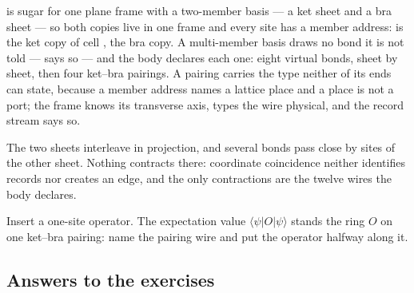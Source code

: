\begin{tnexample}[
  label={tnex:tut-doublelayer},
  formula={\langle\psi|\psi\rangle},
  caption={the norm as a double layer},
  index={Two $2\times2$ sheets in one frame: $A$ marks the ket sheet,
    $\overline{A}$ the bra copy above it.  Each short diagonal is one
    ket--bra physical contraction; nothing stays open, and the empty
    signature says scalar.},
  signature={kernel-boundary|signature=}]
\begin{tenkz}[lattice={2x2}, planes, bonds=none]
   
   
   
   
   
   
\end{tenkz}
\end{tnexample}

 is sugar for one plane frame with a two-member basis ---
a ket sheet and a bra sheet --- so both copies live in one frame and
every site has a member address:  is the ket copy of cell
,  the bra copy.  A multi-member basis draws
no bond it is not told ---  says so --- and the
body declares each one: eight virtual bonds, sheet by sheet, then four
ket--bra pairings.  A pairing carries the type neither of its ends can
state, because a member address names a lattice place and a place is not
a port; the frame knows its transverse axis, types the wire physical,
and the record stream says so.

\dbendpar The two sheets interleave in projection, and several bonds
pass close by sites of the other sheet.  Nothing contracts there:
coordinate coincidence neither identifies records nor creates an edge,
and the only contractions are the twelve wires the body declares.

 Insert a one-site operator.  The
expectation value $\langle\psi\rvert O\lvert\psi\rangle$ stands the
ring $O$ on one ket--bra pairing: name the pairing wire and put the
operator halfway along it.

\subsection{Answers to the exercises}

